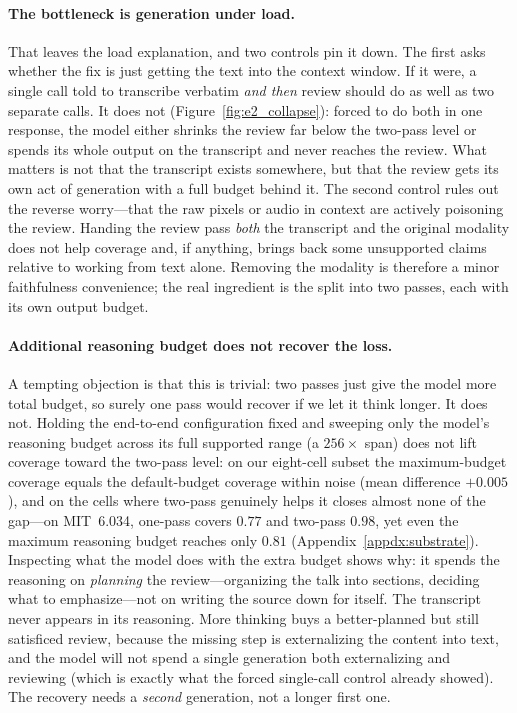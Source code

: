 \documentclass[11pt]{article}
\begin{document}
\paragraph{The bottleneck is generation under load.}
That leaves the load explanation, and two controls pin it down. The first asks whether the fix is just getting the text into the context window. If it were, a single call told to transcribe verbatim \emph{and then} review should do as well as two separate calls. It does not (Figure~\ref{fig:e2_collapse}): forced to do both in one response, the model either shrinks the review far below the two-pass level or spends its whole output on the transcript and never reaches the review. What matters is not that the transcript exists somewhere, but that the review gets its own act of generation with a full budget behind it. The second control rules out the reverse worry---that the raw pixels or audio in context are actively poisoning the review. Handing the review pass \emph{both} the transcript and the original modality does not help coverage and, if anything, brings back some unsupported claims relative to working from text alone. Removing the modality is therefore a minor faithfulness convenience; the real ingredient is the split into two passes, each with its own output budget.

\paragraph{Additional reasoning budget does not recover the loss.}
A tempting objection is that this is trivial: two passes just give the model more total budget, so surely one pass would recover if we let it think longer. It does not. Holding the end-to-end configuration fixed and sweeping only the model's reasoning budget across its full supported range (a $256\times$ span) does not lift coverage toward the two-pass level: on our eight-cell subset the maximum-budget coverage equals the default-budget coverage within noise (mean difference $+0.005$), and on the cells where two-pass genuinely helps it closes almost none of the gap---on MIT~6.034, one-pass covers $0.77$ and two-pass $0.98$, yet even the maximum reasoning budget reaches only $0.81$ (Appendix~\ref{appdx:substrate}). Inspecting what the model does with the extra budget shows why: it spends the reasoning on \emph{planning} the review---organizing the talk into sections, deciding what to emphasize---not on writing the source down for itself. The transcript never appears in its reasoning. More thinking buys a better-planned but still satisficed review, because the missing step is externalizing the content into text, and the model will not spend a single generation both externalizing and reviewing (which is exactly what the forced single-call control already showed). The recovery needs a \emph{second} generation, not a longer first one.
\end{document}
